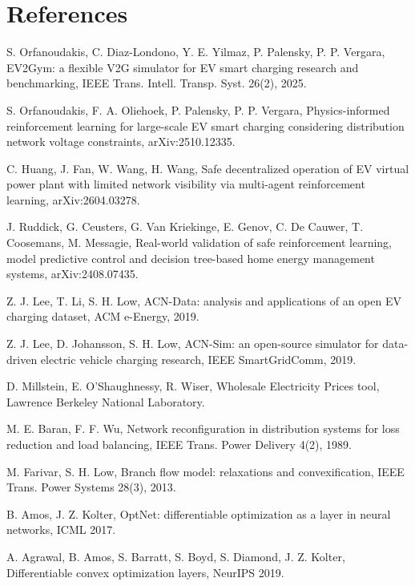 \documentclass[11pt]{article}
\begin{document}
\section*{References}
\footnotesize\setlength{\itemsep}{2pt}
\begin{list}{}{\setlength{\leftmargin}{2.4em}\setlength{\labelwidth}{2.4em}\setlength{\itemsep}{2pt}\setlength{\parsep}{0pt}}
\item[\textbf{[1]}] S. Orfanoudakis, C. Diaz-Londono, Y. E. Yilmaz, P. Palensky, P. P. Vergara, EV2Gym: a flexible V2G simulator for EV smart charging research and benchmarking, IEEE Trans. Intell. Transp. Syst. 26(2), 2025.
\item[\textbf{[2]}] S. Orfanoudakis, F. A. Oliehoek, P. Palensky, P. P. Vergara, Physics-informed reinforcement learning for large-scale EV smart charging considering distribution network voltage constraints, arXiv:2510.12335.
\item[\textbf{[3]}] C. Huang, J. Fan, W. Wang, H. Wang, Safe decentralized operation of EV virtual power plant with limited network visibility via multi-agent reinforcement learning, arXiv:2604.03278.
\item[\textbf{[4]}] J. Ruddick, G. Ceusters, G. Van Kriekinge, E. Genov, C. De Cauwer, T. Coosemans, M. Messagie, Real-world validation of safe reinforcement learning, model predictive control and decision tree-based home energy management systems, arXiv:2408.07435.
\item[\textbf{[5]}] Z. J. Lee, T. Li, S. H. Low, ACN-Data: analysis and applications of an open EV charging dataset, ACM e-Energy, 2019.
\item[\textbf{[6]}] Z. J. Lee, D. Johansson, S. H. Low, ACN-Sim: an open-source simulator for data-driven electric vehicle charging research, IEEE SmartGridComm, 2019.
\item[\textbf{[7]}] D. Millstein, E. O'Shaughnessy, R. Wiser, Wholesale Electricity Prices tool, Lawrence Berkeley National Laboratory.
\item[\textbf{[8]}] M. E. Baran, F. F. Wu, Network reconfiguration in distribution systems for loss reduction and load balancing, IEEE Trans. Power Delivery 4(2), 1989.
\item[\textbf{[9]}] M. Farivar, S. H. Low, Branch flow model: relaxations and convexification, IEEE Trans. Power Systems 28(3), 2013.
\item[\textbf{[10]}] B. Amos, J. Z. Kolter, OptNet: differentiable optimization as a layer in neural networks, ICML 2017.
\item[\textbf{[11]}] A. Agrawal, B. Amos, S. Barratt, S. Boyd, S. Diamond, J. Z. Kolter, Differentiable convex optimization layers, NeurIPS 2019.

\end{list}
\end{document}
